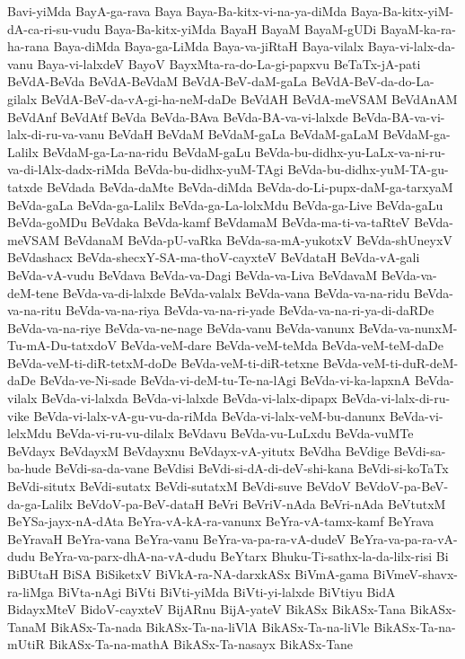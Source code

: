 {Bavi-yiMda
BayA-ga-rava
Baya
Baya-Ba-kitx-vi-na-ya-diMda
Baya-Ba-kitx-yiM-dA-ca-ri-su-vudu
Baya-Ba-kitx-yiMda
BayaH
BayaM
BayaM-gUDi
BayaM-ka-ra-ha-rana
Baya-diMda
Baya-ga-LiMda
Baya-va-jiRtaH
Baya-vilalx
Baya-vi-lalx-da-vanu
Baya-vi-lalxdeV
BayoV
BayxMta-ra-do-La-gi-papxvu
BeTaTx-jA-pati
BeVdA-BeVda
BeVdA-BeVdaM
BeVdA-BeV-daM-gaLa
BeVdA-BeV-da-do-La-gilalx
BeVdA-BeV-da-vA-gi-ha-neM-daDe
BeVdAH
BeVdA-meVSAM
BeVdAnAM
BeVdAnf
BeVdAtf
BeVda
BeVda-BAva
BeVda-BA-va-vi-lalxde
BeVda-BA-va-vi-lalx-di-ru-va-vanu
BeVdaH
BeVdaM
BeVdaM-gaLa
BeVdaM-gaLaM
BeVdaM-ga-Lalilx
BeVdaM-ga-La-na-ridu
BeVdaM-gaLu
BeVda-bu-didhx-yu-LaLx-va-ni-ru-va-di-lAlx-dadx-riMda
BeVda-bu-didhx-yuM-TAgi
BeVda-bu-didhx-yuM-TA-gu-tatxde
BeVdada
BeVda-daMte
BeVda-diMda
BeVda-do-Li-pupx-daM-ga-tarxyaM
BeVda-gaLa
BeVda-ga-Lalilx
BeVda-ga-La-lolxMdu
BeVda-ga-Live
BeVda-gaLu
BeVda-goMDu
BeVdaka
BeVda-kamf
BeVdamaM
BeVda-ma-ti-va-taRteV
BeVda-meVSAM
BeVdanaM
BeVda-pU-vaRka
BeVda-sa-mA-yukotxV
BeVda-shUneyxV
BeVdashacx
BeVda-shecxY-SA-ma-thoV-cayxteV
BeVdataH
BeVda-vA-gali
BeVda-vA-vudu
BeVdava
BeVda-va-Dagi
BeVda-va-Liva
BeVdavaM
BeVda-va-deM-tene
BeVda-va-di-lalxde
BeVda-valalx
BeVda-vana
BeVda-va-na-ridu
BeVda-va-na-ritu
BeVda-va-na-riya
BeVda-va-na-ri-yade
BeVda-va-na-ri-ya-di-daRDe
BeVda-va-na-riye
BeVda-va-ne-nage
BeVda-vanu
BeVda-vanunx
BeVda-va-nunxM-Tu-mA-Du-tatxdoV
BeVda-veM-dare
BeVda-veM-teMda
BeVda-veM-teM-daDe
BeVda-veM-ti-diR-tetxM-doDe
BeVda-veM-ti-diR-tetxne
BeVda-veM-ti-duR-deM-daDe
BeVda-ve-Ni-sade
BeVda-vi-deM-tu-Te-na-lAgi
BeVda-vi-ka-lapxnA
BeVda-vilalx
BeVda-vi-lalxda
BeVda-vi-lalxde
BeVda-vi-lalx-dipapx
BeVda-vi-lalx-di-ru-vike
BeVda-vi-lalx-vA-gu-vu-da-riMda
BeVda-vi-lalx-veM-bu-danunx
BeVda-vi-lelxMdu
BeVda-vi-ru-vu-dilalx
BeVdavu
BeVda-vu-LuLxdu
BeVda-vuMTe
BeVdayx
BeVdayxM
BeVdayxnu
BeVdayx-vA-yitutx
BeVdha
BeVdige
BeVdi-sa-ba-hude
BeVdi-sa-da-vane
BeVdisi
BeVdi-si-dA-di-deV-shi-kana
BeVdi-si-koTaTx
BeVdi-situtx
BeVdi-sutatx
BeVdi-sutatxM
BeVdi-suve
BeVdoV
BeVdoV-pa-BeV-da-ga-Lalilx
BeVdoV-pa-BeV-dataH
BeVri
BeVriV-nAda
BeVri-nAda
BeVtutxM
BeYSa-jayx-nA-dAta
BeYra-vA-kA-ra-vanunx
BeYra-vA-tamx-kamf
BeYrava
BeYravaH
BeYra-vana
BeYra-vanu
BeYra-va-pa-ra-vA-dudeV
BeYra-va-pa-ra-vA-dudu
BeYra-va-parx-dhA-na-vA-dudu
BeYtarx
Bhuku-Ti-sathx-la-da-lilx-risi
Bi
BiBUtaH
BiSA
BiSiketxV
BiVkA-ra-NA-darxkASx
BiVmA-gama
BiVmeV-shavx-ra-liMga
BiVta-nAgi
BiVti
BiVti-yiMda
BiVti-yi-lalxde
BiVtiyu
BidA
BidayxMteV
BidoV-cayxteV
BijARnu
BijA-yateV
BikASx
BikASx-Tana
BikASx-TanaM
BikASx-Ta-nada
BikASx-Ta-na-liVlA
BikASx-Ta-na-liVle
BikASx-Ta-na-mUtiR
BikASx-Ta-na-mathA
BikASx-Ta-nasayx
BikASx-Tane
}
